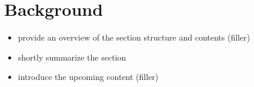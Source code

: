 \section{Background}

\begin{itemize}
  \item provide an overview of the section structure and contents (filler)
\end{itemize}





\begin{itemize}
  \item shortly summarize the section
  \item introduce the upcoming content (filler)
\end{itemize}
